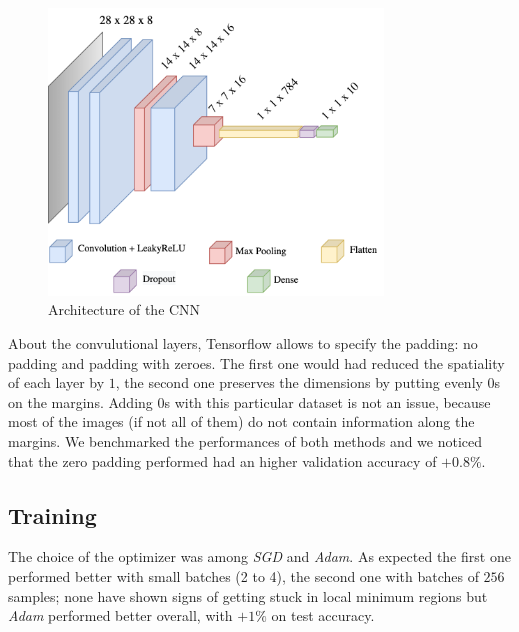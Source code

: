 \documentclass[compsoc]{IEEEtran}
\begin{document}
\begin{figure}[ht!]
\centering                                                                        
\includegraphics[width=3.5in]{cnn.png}
\captionsetup{justification=centering}                                                                                         
\caption{Architecture of the CNN}
\label{fig:cnn}                                                                                                                               
\end{figure}

About the convulutional layers, Tensorflow allows to specify the padding: no padding and padding with zeroes. The first one would had reduced the spatiality of each layer by $1$, the second one preserves the dimensions by putting evenly $0$s on the margins. Adding $0$s with this particular dataset is not an issue, because most of the images (if not all of them) do not contain information along the margins.
We benchmarked the performances of both methods and we noticed that the zero padding performed had an higher validation accuracy of $+0.8\%$.




\subsection{Training}
The choice of the optimizer was among \emph{SGD} and \emph{Adam}. As expected the first one performed better with small batches (2 to 4), the second one with batches of $256$ samples; 
none have shown signs of getting stuck in local minimum regions but \emph{Adam} performed better overall, with $+1\%$ on test accuracy. \par
\end{document}
